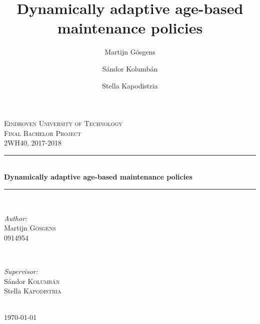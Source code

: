 \documentclass[a4paper]{thesis}
\theoremstyle{definition}
\providecommand{\DIFaddbegin}{} %
\providecommand{\DIFaddend}{} %
\newcommand{\DIFaddincludegraphics}[2][]{{\color{blue}\fbox{\DIFOincludegraphics[#1]{#2}}}} %
\DeclareRobustCommand{\DIFaddbegin}{\DIFOaddbegin \let\includegraphics\DIFaddincludegraphics} %
\DeclareRobustCommand{\DIFaddend}{\DIFOaddend \let\includegraphics\DIFOincludegraphics} %
\begin{document}
	\DIFaddbegin \frontmatter
	\DIFaddend \title{Dynamically adaptive age-based maintenance policies}
	\author{Martijn G\"{o}sgens\\
		\and
		S\'{a}ndor Kolumb\'{a}n\\
		\and
		Stella Kapodistria
	}
	\begin{titlepage}
		
		\newcommand{\HRule}{\rule{\linewidth}{0.5mm}} 
		
		\center 
		
		
		\textsc{\LARGE Eindhoven University of Technology}\\[1.5cm] 
		
		\textsc{\Large Final Bachelor Project}\\[0.5cm] 
		\textsc{\large 2WH40, 2017-2018}\\[0.5cm] 
		
		\HRule \\[0.4cm]
		{ \huge \bfseries Dynamically adaptive age-based maintenance policies}\\[0.4cm] 
		\HRule \\[1.5cm]
		
		
		\begin{minipage}{0.4\textwidth}
			\begin{flushleft} \large
				\emph{Author:}\\
				Martijn \textsc{G\"{o}sgens}\\
				0914954 
			\end{flushleft}
		\end{minipage}
		~
		\begin{minipage}{0.4\textwidth}
			\begin{flushright} \large
				\emph{Supervisor:} \\
				S\'{a}ndor \textsc{Kolumb\'{a}n}\\ 
				Stella \textsc{Kapodistria}
			\end{flushright}
		\end{minipage}\\[2cm]
		
		
		
		{\large \today}\\[2cm] 
		
		
		
		
		\vfill 
		
	\end{titlepage} 
	
\end{document}
